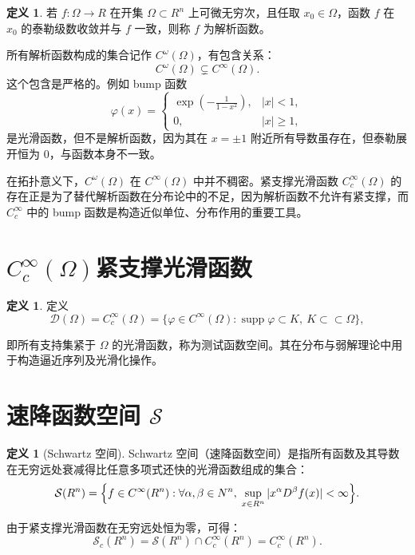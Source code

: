 \documentclass[12pt,a4paper]{article}
\newcommand{\R}{\mathbb{R}}                %
\newcommand{\N}{\mathbb{N}}                %
\DeclareMathOperator{\supp}{supp}           %
\def\R{R}%
\def\N{N}%
\theoremstyle{plain}
\theoremstyle{definition}
\newtheorem{definition}[theorem]{定义}
\theoremstyle{remark}
\begin{document}
	\begin{definition}
		若 $f:\Omega\to\R$ 在开集 $\Omega\subset\R^n$ 上可微无穷次，且任取 $x_0\in\Omega$，函数 $f$ 在 $x_0$ 的泰勒级数收敛并与 $f$ 一致，则称 $f$ 为解析函数。
	\end{definition}
	
	所有解析函数构成的集合记作 $C^\omega(\Omega)$，有包含关系：
	\[
	C^\omega(\Omega)\subsetneq C^\infty(\Omega).
	\]
	这个包含是严格的。例如 bump 函数
	\[
	\varphi(x)=
	\begin{cases}
		\exp\left(-\frac{1}{1-x^2}\right), & |x|<1, \\
		0, & |x|\ge 1,
	\end{cases}
	\]
	是光滑函数，但不是解析函数，因为其在 $x=\pm 1$ 附近所有导数虽存在，但泰勒展开恒为 0，与函数本身不一致。
	
	在拓扑意义下，$C^\omega(\Omega)$ 在 $C^\infty(\Omega)$ 中并不稠密。紧支撑光滑函数 $C_c^\infty(\Omega)$ 的存在正是为了替代解析函数在分布论中的不足，因为解析函数不允许有紧支撑，而 $C_c^\infty$ 中的 bump 函数是构造近似单位、分布作用的重要工具。
	
	\section{\texorpdfstring{$C_c^\infty(\Omega)$}{Cc∞}紧支撑光滑函数}
	
	\begin{definition}
		定义
		\[
		\mathcal D(\Omega)=	C_c^\infty(\Omega)
		=\{\varphi\in C^\infty(\Omega):\supp\varphi\subset K,\ K\subset\subset\Omega\},
		\]
		
		
		即所有支持集紧于 $\Omega$ 的光滑函数，称为测试函数空间。其在分布与弱解理论中用于构造逼近序列及光滑化操作。
	\end{definition}
	
\section{速降函数空间 $\mathcal S$}

\begin{definition}[Schwartz 空间]
	Schwartz 空间（速降函数空间）是指所有函数及其导数在无穷远处衰减得比任意多项式还快的光滑函数组成的集合：
	\[
	\mathcal S(\R^n)
	=\Bigl\{f\in C^\infty(\R^n):
	\forall\alpha,\beta\in\N^n,\;\sup_{x\in\R^n}|x^\alpha D^\beta f(x)|<\infty\Bigr\}.
	\]
\end{definition}


由于紧支撑光滑函数在无穷远处恒为零，可得：
\[
\mathcal S_c(\R^n)
=\mathcal S(\R^n)\cap C_c^\infty(\R^n)
=C_c^\infty(\R^n).
\]
\end{document}
